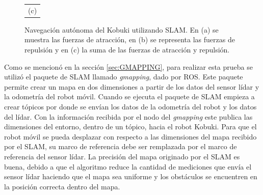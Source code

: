 \begin{figure}
\begin{tabular}{c}
      \multicolumn{1}{c}{(c)}
    \end{tabular}
  \captionsetup{font=footnotesize}
    \caption{\label{fig:Kbki_slam}Navegación autónoma del Kobuki utilizando
    SLAM. En (a) se muestra las fuerzas de atracción, en (b) se representa 
    las fuerzas de repulsión y en (c) la suma de las fuerzas de atracción y 
    repulsión.}
\end{figure}


Como se mencionó en la sección \ref{sec:GMAPPING}, para realizar esta prueba se utilizó
el paquete de SLAM llamado \textit{gmapping}, dado por ROS. Este paquete permite crear 
un mapa en dos dimensiones a partir de los datos del sensor lídar y la odometría del 
robot móvil. Cuando se ejecuta el paquete de SLAM empieza a crear tópicos por donde se
envían los datos de la odometría del robot y los datos del lídar. Con la información 
recibida por el nodo del \textit{gmapping} este publica las dimensiones del entorno, dentro
de un tópico, hacia el robot Kobuki. Para que el robot móvil se pueda desplazar con respecto
a las dimensiones del mapa recibido por el SLAM, su marco de referencia debe ser remplazada
por el marco de referencia del sensor lídar. La precisión del mapa originado por el SLAM es 
buena, debido a que el algoritmo reduce la cantidad de mediciones que envía el sensor lídar
haciendo que el mapa sea uniforme y los obstáculos se encuentren en la posición correcta
dentro del mapa.

